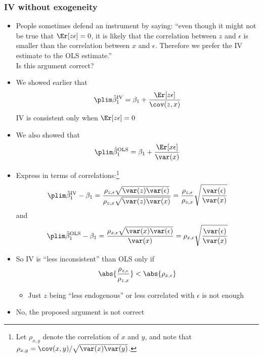 \begin{frame}[allowframebreaks]\frametitle{IV without exogeneity}
  \begin{itemize}
  \item People sometimes defend an instrument by saying: ``even though
    it might not be true that $\Er[z \epsilon]=0$, it is likely that
    the correlation between $z$ and $\epsilon$ is smaller than the
    correlation between $x$ and $\epsilon$. Therefore we prefer the IV
    estimate to the OLS estimate.'' \\
    Is this argument correct?
    \pause
  \item We showed earlier that 
    \[ \plim \biv_1 = \beta_1 + \frac{ \Er[z \epsilon]}{\cov(z,x)} \] 
    IV is consistent only when $\Er[z \epsilon] = 0$
  \item We also showed that 
    \[ \plim \bols_1 = \beta_1 + \frac{\Er[x \epsilon]}{\var(x)} \]
    \pause
  \item Express in terms of correlations:\footnote{Let
      $\rho_{x,y}$ denote the correlation of $x$ and $y$, and note
      that $\rho_{x,y} = \cov(x,y) / \sqrt{\var(x)\var(y)}$. } 
    \[ \plim \biv_1 - \beta_1 = \frac{ \rho_{z,\epsilon}
      \sqrt{\var(z)\var(\epsilon)}} {\rho_{z,x} \sqrt{\var(z)\var(x)}}
    = \frac{\rho_{z,\epsilon}}{\rho_{z,x}}
    \sqrt{\frac{\var(\epsilon)}{\var(x)}} \]
    and 
    \[ \plim \bols_1 - \beta_1 = \frac{ \rho_{x,\epsilon}
      \sqrt{\var(x)\var(\epsilon)}} {\var(x)}
    = \rho_{x,\epsilon} \sqrt{\frac{\var(\epsilon)}{\var(x)}} \]
  \item So IV is ``less inconsistent'' than OLS only if
    \[ \abs{\frac{\rho_{z,\epsilon}}{\rho_{z,x}}} <
    \abs{\rho_{x,\epsilon}} \]
    \begin{itemize}
    \item Just $z$ being ``less endogenous'' or less correlated with
      $\epsilon$ is not enough
    \end{itemize}
  \item No, the proposed argument is not correct
  \end{itemize}
\end{frame}

